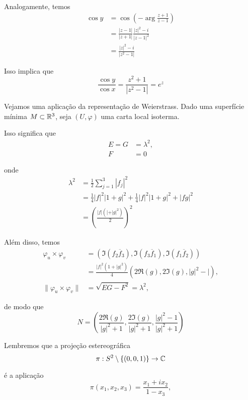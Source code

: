 \begin{exemplo}
	Analogamente, temos
	\begin{align*}
	\cos y &= \cos \left( -\arg \frac{z + 1}{z - 1} \right) \\
	&= \frac{|z - 1|}{|z + 1|} \frac{|z|^2 - i}{|z - 1|^2} \\
	&= \frac{|z|^2 - i}{|z^2 - 1|}
	\end{align*}
	
	Isso implica que
	\begin{equation*}
	\frac{\cos y}{\cos x} = \frac{z^2 + 1}{|z^2 - 1|} = e^z
	\end{equation*}
	
	Vejamos uma aplicação da representação de Weierstrass. Dado uma superfície mínima $M \subset \mathbb{R}^3$, seja $(U, \varphi)$ uma carta local isoterma.
	
	Isso significa que
	\begin{align*}
	E = G &= \lambda^2, \\
	F &= 0
	\end{align*}
	
	onde
	\begin{align*}
	\lambda^2 &= \frac{1}{2} \sum_{j=1}^{3} |f_j|^2 \\
	&= \frac{1}{4} |f|^2 |1 + g|^2 + \frac{1}{4} |f|^2 |1 + g|^2 + |fg|^2\\
	&= \left( \frac{|f| (| + |g|^2)}{2} \right)^2
	\end{align*} 
	
	Além disso, temos
	\begin{align*}
	\varphi_u \times \varphi_v &= \left( \Im (f_2 \overline{f}_3), \Im (f_3 \overline{f}_1), \Im (f_1 \overline{f}_2) \right) \\
	&= \frac{|f|^2 (1 + |g|^2)}{4} \left( 2 \Re(g), 2 \Im(g), |g|^2 - | \right), \\
	\| \varphi_u \times \varphi_v \| &= \sqrt{EG - F^2} = \lambda^2,
	\end{align*}
	
	de modo que
	\begin{equation*}
	N = \left( \frac{2 \Re(g)}{|g|^2 + 1}, \frac{2 \Im(g)}{|g|^2 + 1}, \frac{|g|^2 - 1}{|g|^2 + 1} \right)
	\end{equation*}
	
	Lembremos que a projeção estereográfica
	\begin{equation*}
	\pi: S^2 \setminus \{ (0,0,1) \} \rightarrow \mathbb{C}
	\end{equation*}
	
	é a aplicação
	\begin{equation*}
	\pi(x_1, x_2, x_3) = \frac{x_1 + ix_2}{1 - x_3},
	\end{equation*}
	

\end{exemplo}
